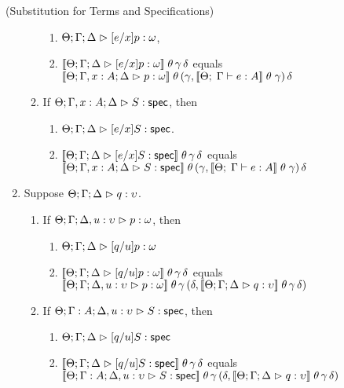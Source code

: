 \begin{lemma*}{(Substitution for Terms and Specifications)}
\begin{enumerate}
\begin{enumerate}
\begin{enumerate}
        \item $\judgeA[\Theta; \Gamma; \Delta]{[e/x]p}{\omega}$, 
        \item $\interp{\judgeA[\Theta; \Gamma; \Delta]{[e/x]p}{\omega}}\;\theta\,\gamma\,\delta$ equals \\
              $\interp{\judgeA[\Theta; \Gamma, x:A; \Delta]{p}{\omega}}\;\theta\,(\gamma, \interp{\judgeE{\Gamma}{e}{A}}\;\theta\;\gamma)\,\delta$               
        \end{enumerate}
  \item If $\judgeS[\Theta; \Gamma, x:A; \Delta]{S}$, 
        then 
        \begin{enumerate}
        \item $\judgeS[\Theta; \Gamma; \Delta]{[e/x]S}$.
        \item $\interp{\judgeS[\Theta; \Gamma; \Delta]{[e/x]S}}\;\theta\,\gamma\,\delta$ equals \\
              $\interp{\judgeS[\Theta; \Gamma, x:A; \Delta]{S}}\;\theta\,(\gamma, \interp{\judgeE{\Gamma}{e}{A}}\;\theta\;\gamma)\,\delta$
        \end{enumerate}
  \end{enumerate}
\item Suppose $\judgeA{q}{\upsilon}$.
  \begin{enumerate}
  \item If $\judgeA[\Theta; \Gamma; \Delta, u:\upsilon]{p}{\omega}$, 
        then 
        \begin{enumerate}
          \item $\judgeA[\Theta; \Gamma; \Delta]{[q/u]p}{\omega}$
          \item $\interp{\judgeA[\Theta; \Gamma; \Delta]{[q/u]p}{\omega}}\;\theta\,\gamma\,\delta$ equals \\
                $\interp{\judgeA[\Theta; \Gamma; \Delta, u:\upsilon]{p}{\omega}}\;\theta\,\gamma\,(\delta, \interp{\judgeA{q}{\upsilon}}\;\theta\,\gamma\,\delta)$
        \end{enumerate}
      \item If $\judgeS[\Theta; \Gamma:A; \Delta, u:\upsilon]{S}$, 
        then 
        \begin{enumerate}
          \item $\judgeS[\Theta; \Gamma; \Delta]{[q/u]S}$ 
          \item $\interp{\judgeS[\Theta; \Gamma; \Delta]{[q/u]S}}\;\theta\,\gamma\,\delta$ equals \\
                $\interp{\judgeS[\Theta; \Gamma:A; \Delta, u:\upsilon]{S}}\;\theta\,\gamma\,(\delta, \interp{\judgeA{q}{\upsilon}}\;\theta\,\gamma\,\delta)$
        \end{enumerate}
  \end{enumerate}

\end{enumerate}
\end{lemma*}
